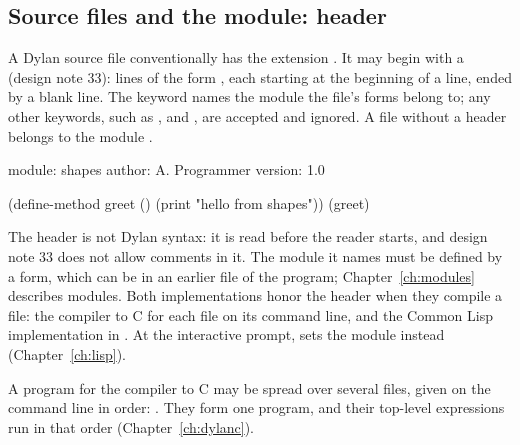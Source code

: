 \subsection{Source files and the module: header}\label{sec:syntax-files}

A Dylan source file conventionally has the extension . It may
begin with a  (design note 33): lines of the form
\code{:} , each starting at the beginning of a
line, ended by a blank line. The keyword  names the module
the file's forms belong to; any other keywords, such as ,
 and , are accepted and ignored. A file
without a header belongs to the module .

\begin{dylan}
module: shapes
author: A. Programmer
version: 1.0

(define-method greet ()
  (print "hello from shapes"))
(greet)
\end{dylan}

\noindent The header is not Dylan syntax: it is read before the reader
starts, and design note 33 does not allow comments in it. The module it names must be
defined by a  form, which can be in an earlier file of
the program; Chapter~\ref{ch:modules} describes modules. Both implementations
honor the header when they compile a file: the compiler to C for each file
on its command line, and the Common Lisp implementation in
. At the interactive prompt,  sets the module instead (Chapter~\ref{ch:lisp}).

A program for the compiler to C may be spread over several files, given on
the command line in order: . They form
one program, and their top-level expressions run in that order
(Chapter~\ref{ch:dylanc}).
